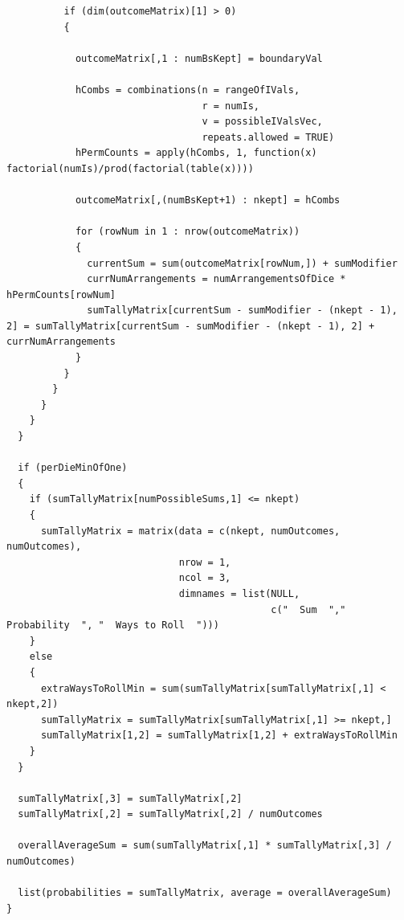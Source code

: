 \documentclass[12pt]{article}
\begin{document}
\begin{lstlisting}
          if (dim(outcomeMatrix)[1] > 0)
          {
            
            outcomeMatrix[,1 : numBsKept] = boundaryVal
            
            hCombs = combinations(n = rangeOfIVals,
                                  r = numIs,
                                  v = possibleIValsVec,
                                  repeats.allowed = TRUE)
            hPermCounts = apply(hCombs, 1, function(x) factorial(numIs)/prod(factorial(table(x))))
            
            outcomeMatrix[,(numBsKept+1) : nkept] = hCombs
            
            for (rowNum in 1 : nrow(outcomeMatrix))
            {
              currentSum = sum(outcomeMatrix[rowNum,]) + sumModifier
              currNumArrangements = numArrangementsOfDice * hPermCounts[rowNum]
              sumTallyMatrix[currentSum - sumModifier - (nkept - 1), 2] = sumTallyMatrix[currentSum - sumModifier - (nkept - 1), 2] + currNumArrangements
            }
          }
        }
      }
    }
  }
  
  if (perDieMinOfOne)
  {
    if (sumTallyMatrix[numPossibleSums,1] <= nkept)
    {
      sumTallyMatrix = matrix(data = c(nkept, numOutcomes, numOutcomes),
                              nrow = 1,
                              ncol = 3,
                              dimnames = list(NULL,
                                              c("  Sum  ","  Probability  ", "  Ways to Roll  ")))
    }
    else
    {
      extraWaysToRollMin = sum(sumTallyMatrix[sumTallyMatrix[,1] < nkept,2])
      sumTallyMatrix = sumTallyMatrix[sumTallyMatrix[,1] >= nkept,]
      sumTallyMatrix[1,2] = sumTallyMatrix[1,2] + extraWaysToRollMin
    }
  }
  
  sumTallyMatrix[,3] = sumTallyMatrix[,2]
  sumTallyMatrix[,2] = sumTallyMatrix[,2] / numOutcomes
  
  overallAverageSum = sum(sumTallyMatrix[,1] * sumTallyMatrix[,3] / numOutcomes)
  
  list(probabilities = sumTallyMatrix, average = overallAverageSum)
}

\end{lstlisting}
\end{document}
